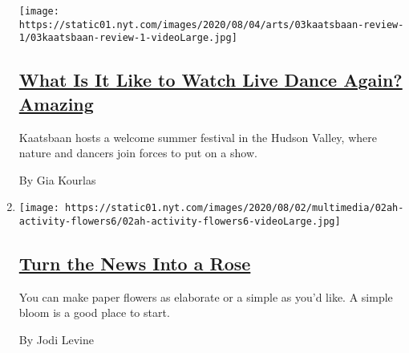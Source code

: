 \begin{enumerate}
  \texttt{[image: https://static01.nyt.com/images/2020/08/04/arts/03kaatsbaan-review-1/03kaatsbaan-review-1-videoLarge.jpg]}

  \hypertarget{what-is-it-like-to-watch-live-dance-again-amazing}{%
  \subsection{\texorpdfstring{\href{/2020/08/03/arts/dance/kaatsbaan-dance.html}{What
  Is It Like to Watch Live Dance Again?
  Amazing}}{What Is It Like to Watch Live Dance Again? Amazing}}\label{what-is-it-like-to-watch-live-dance-again-amazing}}

  Kaatsbaan hosts a welcome summer festival in the Hudson Valley, where
  nature and dancers join forces to put on a show.

  By Gia Kourlas
\item
  \texttt{[image: https://static01.nyt.com/images/2020/08/02/multimedia/02ah-activity-flowers6/02ah-activity-flowers6-videoLarge.jpg]}

  \hypertarget{turn-the-news-into-a-rose}{%
  \subsection{\texorpdfstring{\href{/2020/08/01/at-home/coronavirus-paper-flowers.html}{Turn
  the News Into a
  Rose}}{Turn the News Into a Rose}}\label{turn-the-news-into-a-rose}}

  You can make paper flowers as elaborate or a simple as you'd like. A
  simple bloom is a good place to start.

  By Jodi Levine
\end{enumerate}

